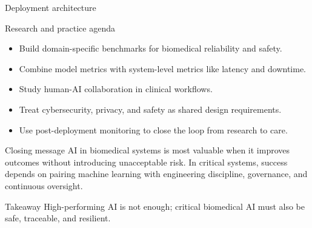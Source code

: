 \documentclass[aspectratio=169]{beamer}
\begin{document}
\begin{frame}{Deployment architecture}
\begin{center}
\end{center}
\end{frame}

\begin{frame}{Research and practice agenda}
\begin{itemize}
  \item Build domain-specific benchmarks for biomedical reliability and safety.
  \item Combine model metrics with system-level metrics like latency and downtime.
  \item Study human-AI collaboration in clinical workflows.
  \item Treat cybersecurity, privacy, and safety as shared design requirements.
  \item Use post-deployment monitoring to close the loop from research to care.
\end{itemize}
\end{frame}

\begin{frame}{Closing message}
AI in biomedical systems is most valuable when it improves outcomes without introducing unacceptable risk. In critical systems, success depends on pairing machine learning with engineering discipline, governance, and continuous oversight.
\vspace{0.5em}
\begin{block}{Takeaway}
  High-performing AI is not enough; critical biomedical AI must also be safe, traceable, and resilient.
\end{block}
\end{frame}
\end{document}
